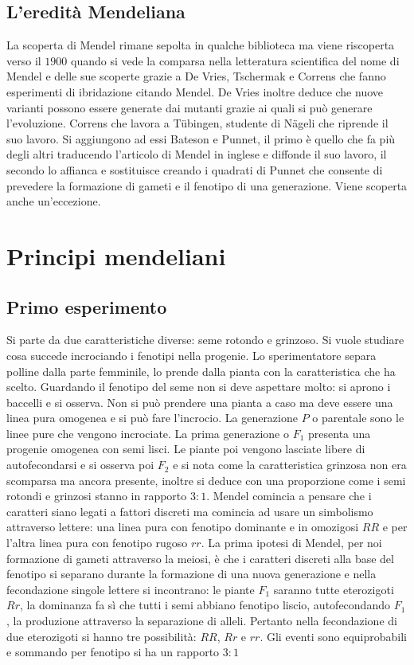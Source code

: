 \subsection{L'eredit\`a Mendeliana}
La scoperta di Mendel rimane sepolta in qualche biblioteca ma viene riscoperta verso il $1900$ quando si vede la 
comparsa nella letteratura scientifica del nome di Mendel e delle sue scoperte grazie a De Vries, Tschermak e Correns che fanno esperimenti di ibridazione citando Mendel. De Vries 
inoltre deduce che nuove varianti possono essere generate dai mutanti grazie ai quali si pu\`o generare l'evoluzione. Correns che lavora a T\"ubingen, studente di N\"ageli che riprende
il suo lavoro. Si aggiungono ad essi Bateson e Punnet, il primo \`e quello che fa pi\`u degli altri traducendo l'articolo di Mendel in inglese e diffonde il suo lavoro, il 
secondo lo affianca e sostituisce creando i quadrati di Punnet che consente di prevedere la formazione di gameti e il fenotipo di una generazione. Viene scoperta anche un'eccezione. 
\section{Principi mendeliani}
\subsection{Primo esperimento}
Si parte da due caratteristiche diverse: seme rotondo e grinzoso. Si vuole studiare cosa succede incrociando i fenotipi nella progenie. Lo sperimentatore separa polline dalla parte 
femminile, lo prende dalla pianta con la caratteristica che ha scelto. Guardando il fenotipo del seme non si deve aspettare molto: si aprono i baccelli e si osserva. Non si pu\`o 
prendere una pianta a caso ma deve essere una linea pura omogenea e si pu\`o fare l'incrocio. La generazione $P$ o parentale sono le linee pure che vengono incrociate. La prima
generazione o $F_1$ presenta una progenie omogenea con semi lisci. Le piante poi vengono lasciate libere di autofecondarsi e si osserva poi $F_2$ e si nota come la caratteristica 
grinzosa non era scomparsa ma ancora presente, inoltre si deduce con una proporzione come i semi rotondi e grinzosi stanno in rapporto $3:1$. Mendel comincia a pensare che i caratteri
siano legati a fattori discreti ma comincia ad usare un simbolismo attraverso lettere: una linea pura con fenotipo dominante e in omozigosi $RR$ e per l'altra linea pura con fenotipo
rugoso $rr$. La prima ipotesi di Mendel, per noi formazione di gameti attraverso la meiosi, \`e che i caratteri discreti alla base del fenotipo si separano durante la formazione di
una nuova generazione e nella fecondazione singole lettere si incontrano: le piante $F_1$ saranno tutte eterozigoti $Rr$, la dominanza fa s\`i che tutti i semi abbiano fenotipo liscio, 
autofecondando $F_1$, la produzione attraverso la separazione di alleli. Pertanto nella fecondazione di due eterozigoti si hanno tre possibilit\`a: $RR$, $Rr$ e $rr$. Gli eventi sono
equiprobabili e sommando per fenotipo si ha un rapporto $3:1$
